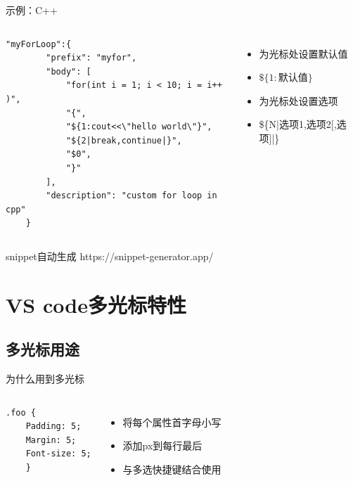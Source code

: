 \documentclass{beamer}
\begin{document}
\begin{frame}[fragile]{示例：C++}
    \begin{columns}

        \begin{lstlisting}[language=Tex,basicstyle=\tiny]
    "myForLoop":{
        "prefix": "myfor",
        "body": [
            "for(int i = 1; i < 10; i = i++ )",
            "{",
            "${1:cout<<\"hello world\"}",
            "${2|break,continue|}",
            "$0",
            "}"
        ],
        "description": "custom for loop in cpp"
    }
    \end{lstlisting}
        \begin{itemize}
            \item 为光标处设置默认值
            \item $\$\{1:\text{默认值}\}$
            \item 为光标处设置选项
            \item \$\{N|选项1,选项2[,选项]|\}
        \end{itemize}
    \end{columns}
\end{frame}

\begin{frame}{snippet自动生成}
    https://snippet-generator.app/
\end{frame}

\section{VS code多光标特性}
\subsection{多光标用途}

\begin{frame}[fragile]{为什么用到多光标}
    \begin{columns}

        \begin{lstlisting}[language=Html,basicstyle=\small]
.foo {
    Padding: 5;
    Margin: 5;
    Font-size: 5;
    }
    \end{lstlisting}

        \begin{itemize}
            \item 将每个属性首字母小写
            \item 添加px到每行最后
            \item  {\color{red} 与多选快捷键结合使用}
        \end{itemize}

    \end{columns}
\end{frame}
\end{document}
